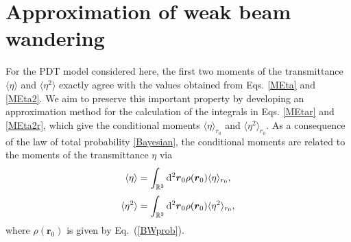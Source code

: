 \documentclass[aps,pra,twocolumn,a4paper,nofootinbib,preprintnumbers] {revtex4-1}
\newcommand{\D}{{\rm{d}}}
\begin{document}
	






\section{Approximation of weak beam wandering}\label{sec:Approx}

	
	For the PDT model considered here, the first two moments of the transmittance $\langle\eta\rangle$ and $\langle\eta^2\rangle$ exactly agree with the values obtained from Eqs. \eqref{MEta} and \eqref{MEta2}.
	We aim to preserve this important property by developing an approximation method for the calculation of the integrals in Eqs. \eqref{MEtar} and \eqref{MEta2r}, which give the conditional moments $\langle\eta\rangle_{r_0}$ and $\langle\eta^2\rangle_{r_0}$.
	As a consequence of the law of total probability \eqref{Bayesian}, the conditional moments are related to the moments of the transmittance $\eta$ via
		\begin{align}\label{moment1}
		\langle\eta\rangle=\int_{\mathbb{R}^2}  \D^2 \boldsymbol{r}_0 \rho(\boldsymbol{r}_0)\langle\eta\rangle_{r_0},
		\end{align}
		\begin{align}\label{moment2}
		\langle\eta^2\rangle=\int_{\mathbb{R}^2}  \D^2 \boldsymbol{r}_0 \rho(\boldsymbol{r}_0)\langle\eta^2\rangle_{{r}_0},
		\end{align}
	where $\rho(\boldsymbol{r}_0)$ is given by Eq.~(\ref{BWprob}).
	
\end{document}
